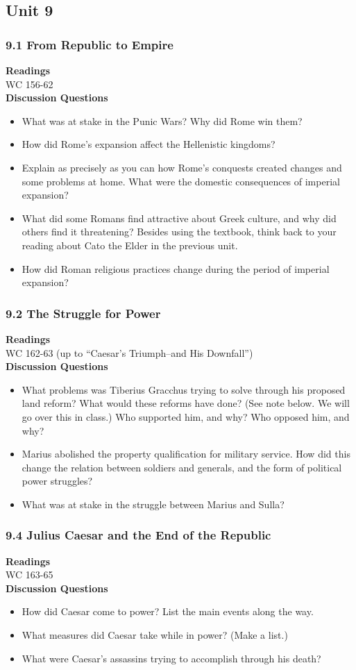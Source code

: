 \documentclass{article}
\begin{document}
\subsection*{Unit 9}
\subsubsection*{9.1 From Republic to Empire}
\textbf{Readings} \\
WC 156-62 \\
\textbf{Discussion Questions}
\begin{itemize}
  \item What was at stake in the Punic Wars? Why did Rome win them?
  \item How did Rome’s expansion affect the Hellenistic kingdoms?
  \item Explain as precisely as you can how Rome’s conquests created changes and some
  problems at home. What were the domestic consequences of imperial expansion?
  \item What did some Romans find attractive about Greek culture, and why did others find
  it threatening? Besides using the textbook, think back to your reading about Cato the
  Elder in the previous unit.
  \item How did Roman religious practices change during the period of imperial
  expansion?
\end{itemize}
\subsubsection*{9.2 The Struggle for Power}
\textbf{Readings} \\
WC 162-63 (up to “Caesar’s Triumph--and His Downfall”) \\
\textbf{Discussion Questions}
\begin{itemize}
  \item What problems was Tiberius Gracchus trying to solve through his proposed land
  reform?  What would these reforms have done? (See note below. We will go over this in
  class.) Who supported him, and why? Who opposed him, and why?
  \item Marius abolished the property qualification for military service. How did this
  change the relation between soldiers and generals, and the form of political power
  struggles?
  \item What was at stake in the struggle between Marius and Sulla?
\end{itemize}
\subsubsection*{9.4 Julius Caesar and the End of the Republic}
\textbf{Readings} \\
WC 163-65 \\
\textbf{Discussion Questions}
\begin{itemize}
  \item How did Caesar come to power? List the main events along the way.
  \item What measures did Caesar take while in power? (Make a list.)
  \item What were Caesar’s assassins trying to accomplish through his death?
\end{itemize}
\end{document}
